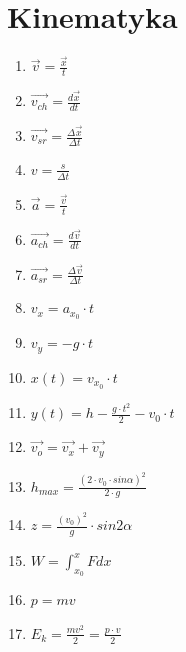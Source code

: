 \documentclass[12pt,twoside,a4paper]{book}
\begin{document}
\section{Kinematyka}
\begin{enumerate}
\item$\overrightarrow{v} = \frac{\overrightarrow{x}}{t}$
\item$\overrightarrow{v_{ch}} = \frac{d\overrightarrow{x}}{dt}$
\item$\overrightarrow{v_{sr}} = \frac{\Delta \overrightarrow{x}}{\Delta t}$
\item$v=\frac{s}{\Delta t}$
\item$\overrightarrow{a} = \frac{\overrightarrow{v}}{t}$
\item$\overrightarrow{a_{ch}} = \frac{d\overrightarrow{v}}{dt}$
\item$\overrightarrow{a_{sr}} = \frac{\Delta \overrightarrow{v}}{\Delta t}$
\item$v_{x}= a_{x_0} \cdot t$
\item$v_{y}= -g \cdot t$
\item$x(t)= v_{x_0} \cdot t$
\item$y(t)= h - \frac{g \cdot t^2 }{2} - v_0 \cdot t$
\item$\overrightarrow{v_o} = \overrightarrow{v_x} + \overrightarrow{v_y}$
\item$h_{max} = \frac{(2 \cdot v_0 \cdot sin\alpha)^2}{2 \cdot g}$
\item$z = \frac{(v_0)^2}{g} \cdot sin2\alpha$
\item$W = \int_{x_0}^{x} Fdx$
\item$p = mv$
\item$E_k = \frac{mv^2}{2} = \frac{p \cdot v}{2}$
\end{enumerate}
\end{document}
